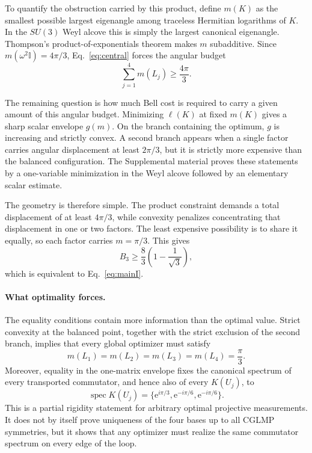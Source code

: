 \documentclass[aps,prl,reprint,superscriptaddress,nofootinbib]{revtex4-2}
\newcommand{\spec}{\operatorname{spec}}
\newcommand{\e}{\mathrm{e}}
\newcommand{\id}{\mathbb{I}}
\begin{document}
To quantify the obstruction carried by this product, define $m(K)$ as the smallest possible largest eigenangle among traceless Hermitian logarithms of $K$. In the $SU(3)$ Weyl alcove this is simply the largest canonical eigenangle. Thompson's product-of-exponentials theorem \cite{Thompson,Antezana} makes $m$ subadditive. Since $m(\omega^2\id)=4\pi/3$, Eq.~\eqref{eq:central} forces the angular budget
\begin{equation}
\sum_{j=1}^{4}m(L_j)\geq\frac{4\pi}{3}.
\label{eq:angbudget}
\end{equation}

The remaining question is how much Bell cost is required to carry a given amount of this angular budget. Minimizing $\ell(K)$ at fixed $m(K)$ gives a sharp scalar envelope $g(m)$. On the branch containing the optimum, $g$ is increasing and strictly convex. A second branch appears when a single factor carries angular displacement at least $2\pi/3$, but it is strictly more expensive than the balanced configuration. The Supplemental material proves these statements by a one-variable minimization in the Weyl alcove followed by an elementary scalar estimate.

The geometry is therefore simple. The product constraint demands a total displacement of at least $4\pi/3$, while convexity penalizes concentrating that displacement in one or two factors. The least expensive possibility is to share it equally, so each factor carries $m=\pi/3$. This gives
\begin{equation}
B_3\geq\frac{8}{3}\left(1-\frac{1}{\sqrt3}\right),
\label{eq:Bbound}
\end{equation}
which is equivalent to Eq.~\eqref{eq:mainI}.

\paragraph{What optimality forces.}
The equality conditions contain more information than the optimal value. Strict convexity at the balanced point, together with the strict exclusion of the second branch, implies that every global optimizer must satisfy
\begin{equation}
m(L_1)=m(L_2)=m(L_3)=m(L_4)=\frac{\pi}{3}.
\label{eq:equalm}
\end{equation}
Moreover, equality in the one-matrix envelope fixes the canonical spectrum of every transported commutator, and hence also of every $K(U_j)$, to
\begin{equation}
\spec K(U_j)=\{\e^{i\pi/3},\e^{-i\pi/6},\e^{-i\pi/6}\}.
\label{eq:rigidspec}
\end{equation}
This is a partial rigidity statement for arbitrary optimal projective measurements. It does not by itself prove uniqueness of the four bases up to all CGLMP symmetries, but it shows that any optimizer must realize the same commutator spectrum on every edge of the loop.
\end{document}
